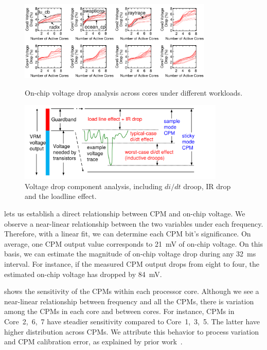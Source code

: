 \begin{figure}[t]
  \centering
  \hspace{-0.5cm}
  \begin{minipage}{0.5\linewidth}
    \centering
    \includegraphics[trim=0 0 0 0,clip,height=1.5in]{graphs/cpm_scale_variation.pdf}
    \captionsetup{width=0.95\textwidth}
    \vspace{-0.2cm}
    \caption{On-chip voltage drop analysis across cores under different workloads.}
  \label{fig:cpm-variation} 
  \end{minipage}
\hspace{0cm}
  \begin{minipage}{0.47\linewidth}
    \centering
    \includegraphics[trim=0 0 0 0,clip,height=1.5in]{graphs/noise_components.pdf}
    \captionsetup{width=0.95\textwidth}
    \vspace{-0.3cm}
    \caption{Voltage drop component analysis, including $di/dt$ droop, IR drop and the loadline effect.}
    \label{fig:vnoise-component} 
  \end{minipage}
\end{figure}

 lets us establish a direct relationship between CPM and on-chip voltage. We observe a near-linear relationship between the two variables under each frequency. Therefore, with a linear fit, we can determine each CPM bit's significance. On average, one CPM output value corresponds to 21~mV of on-chip voltage. On this basis, we can estimate the magnitude of on-chip voltage drop during any 32~ms interval. For instance, if the measured CPM output drops from eight to four, the estimated on-chip voltage has dropped by 84~mV. 

 shows the sensitivity of the CPMs within each processor core. Although we see a near-linear relationship between frequency and all the CPMs, there is variation among the CPMs in each core and between cores. For instance, CPMs in Core~2,~6,~7 have steadier sensitivity compared to Core~1,~3,~5. The latter have higher distribution across CPMs. We attribute this behavior to process variation and CPM calibration error, as explained by prior work~\cite{floyd2013runtime}.

